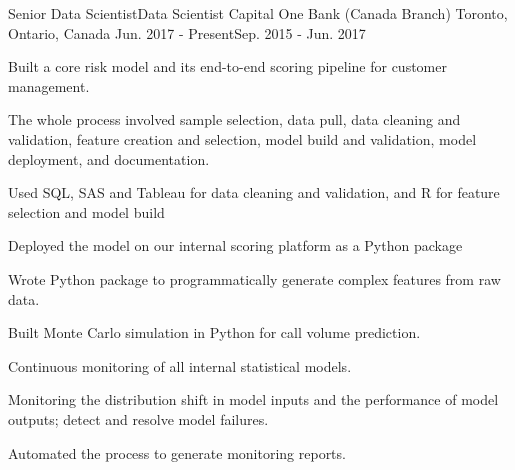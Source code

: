 

\begin{cventries}

  \cventry
    {Senior Data Scientist\newline Data Scientist} %
    {Capital One Bank (Canada Branch)} %
    {Toronto, Ontario, Canada} %
    {Jun. 2017 - Present\newline Sep. 2015 - Jun. 2017} %
    {
      \begin{cvitems} %
        \item {Built a core risk model and its end-to-end scoring pipeline for customer management.}\\
        \begin{cvitems}
          \item {The whole process involved sample selection, data pull, data cleaning and validation, feature creation and selection, model build and validation, model deployment, and documentation.}
          \item {Used SQL, SAS and Tableau for data cleaning and validation, and R for feature selection and model build}
          \item {Deployed the model on our internal scoring platform as a Python package}\\
        \end{cvitems}
        \item {Wrote Python package to programmatically generate complex features from raw data.}
        \item {Built Monte Carlo simulation in Python for call volume prediction.}
        \item {Continuous monitoring of all internal statistical models.}\\
        \begin{cvitems}
          \item {Monitoring the distribution shift in model inputs and the performance of model outputs; detect and resolve model failures.}
          \item {Automated the process to generate monitoring reports.}\\
        \end{cvitems}
      \end{cvitems}
    }

\end{cventries}
